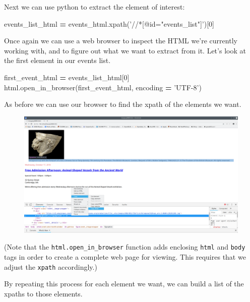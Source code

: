 \documentclass[]{book}
\newenvironment{Shaded}{\begin{snugshade}}{\end{snugshade}}
\newcommand{\DecValTok}[1]{\textcolor[rgb]{0.00,0.00,0.81}{#1}}
\newcommand{\StringTok}[1]{\textcolor[rgb]{0.31,0.60,0.02}{#1}}
\newcommand{\OperatorTok}[1]{\textcolor[rgb]{0.81,0.36,0.00}{\textbf{#1}}}
\newcommand{\NormalTok}[1]{#1}
\begin{document}
Next we can use python to extract the element of interest:

\begin{Shaded}
\begin{Highlighting}[]
\NormalTok{events_list_html }\OperatorTok{=}\NormalTok{ events_html.xpath(}\StringTok{'//*[@id="events_list"]'}\NormalTok{)[}\DecValTok{0}\NormalTok{]}
\end{Highlighting}
\end{Shaded}

Once again we can use a web browser to inspect the HTML we're currently
working with, and to figure out what we want to extract from it. Let's
look at the first element in our events list.

\begin{Shaded}
\begin{Highlighting}[]
\NormalTok{first_event_html }\OperatorTok{=}\NormalTok{ events_list_html[}\DecValTok{0}\NormalTok{]}
\NormalTok{html.open_in_browser(first_event_html, encoding }\OperatorTok{=} \StringTok{'UTF-8'}\NormalTok{)}
\end{Highlighting}
\end{Shaded}

As before we can use our browser to find the xpath of the elements we
want.

\begin{figure}
\centering
\includegraphics{Python/PythonWebScrape/images/dev_tools_figcaption.png}
\caption{}
\end{figure}

(Note that the \texttt{html.open\_in\_browser} function adds enclosing
\texttt{html} and \texttt{body} tags in order to create a complete web
page for viewing. This requires that we adjust the \texttt{xpath}
accordingly.)

By repeating this process for each element we want, we can build a list
of the xpaths to those elements.
\end{document}
